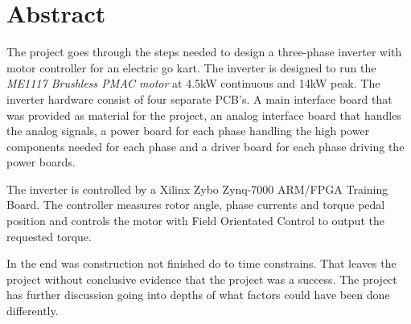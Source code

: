 \section{Abstract}
The project goes through the steps needed to design a three-phase inverter with motor controller for an electric go kart. 
The inverter is designed to run the \textit{ME1117 Brushless PMAC motor} at 4.5kW continuous and 14kW peak. The inverter hardware consist of four separate PCB's. A main interface board that was provided as material for the project, an analog interface board that handles the analog signals, a power board for each phase handling the high power components needed for each phase and a driver board for each phase driving the power boards. 

The inverter is controlled by a Xilinx Zybo Zynq-7000 ARM/FPGA Training Board. The controller measures rotor angle, phase currents and torque pedal position and controls the motor with Field Orientated Control to output the requested torque. 

In the end was construction not finished do to time constrains. That leaves the project without conclusive evidence that the project was a success. The project has further discussion going into depths of what factors could have been done differently.